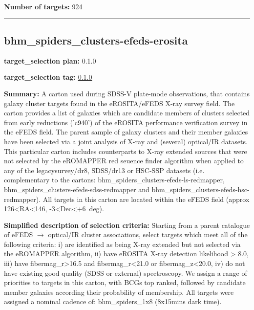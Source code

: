 \noindent\textbf{Number of targets:} 924

\begin{center}\rule{0.5\linewidth}{0.5pt}\end{center}

\hypertarget{bhm_spiders_clusters-efeds-erosita_plan0.1.0}{%
\subsection{bhm\_spiders\_clusters-efeds-erosita}\label{bhm_spiders_clusters-efeds-erosita_plan0.1.0}}

\noindent\textbf{target\_selection plan:} 0.1.0

\noindent\textbf{target\_selection tag:}
\href{https://github.com/sdss/target_selection/tree/0.1.0/}{0.1.0}

\noindent\textbf{Summary:} A carton used during SDSS-V plate-mode observations,
that contains galaxy cluster targets found in the eROSITA/eFEDS X-ray
survey field. The carton provides a list of galaxies which are candidate
members of clusters selected from early reductions ('c940') of the
eROSITA performance verification survey in the eFEDS field. The parent
sample of galaxy clusters and their member galaxies have been selected
via a joint analysis of X-ray and (several) optical/IR datasets. This
particular carton includes counterparts to X-ray extended sources that
were not selected by the eROMAPPER red seuence finder algorithm when
applied to any of the legacysurvey/dr8, SDSS/dr13 or HSC-SSP datasets
(i.e. complementary to the cartons:
bhm\_spiders\_clusters-efeds-ls-redmapper,
bhm\_spiders\_clusters-efeds-sdss-redmapper and
bhm\_spiders\_clusters-efeds-hsc-redmapper). All targets in this carton
are located within the eFEDS field (approx 126\textless RA\textless146,
-3\textless Dec\textless+6~deg).

\noindent\textbf{Simplified description of selection criteria:} Starting from a
parent catalogue of eFEDS $\rightarrow$ optical/IR cluster associations, select
targets which meet all of the following criteria: i) are identified as
being X-ray extended but not selected via the eROMAPPER algorithm, ii)
have eROSITA X-ray detection likelihood \textgreater{} 8.0, iii) have
fibermag\_r\textgreater16.5 and fibermag\_r\textless21.0 or
fibermag\_z\textless20.0, iv) do not have existing good quality (SDSS or
external) spectroscopy. We assign a range of priorities to targets in
this carton, with BCGs top ranked, followed by candidate member galaxies
according their probability of membership. All targets were assigned a
nominal cadence of: bhm\_spiders\_1x8 (8x15mins dark time).


